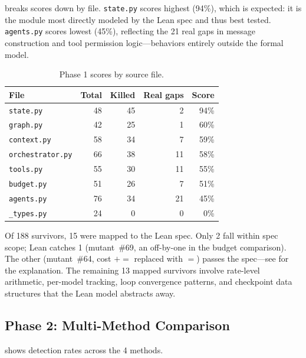 \documentclass[11pt,a4paper]{article}
\begin{document}
 breaks scores down by file. \texttt{state.py}
scores highest (94\%), which is expected: it is the module most
directly modeled by the Lean spec and thus best tested.
\texttt{agents.py} scores lowest (45\%), reflecting the 21 real
gaps in message construction and tool permission logic---behaviors
entirely outside the formal model.

\begin{table}[htbp]
\centering
\caption{Phase 1 scores by source file.}
\label{tab:byfile}
\small
\begin{tabular}{@{}lrrrr@{}}
\toprule
\textbf{File} & \textbf{Total} & \textbf{Killed} & \textbf{Real gaps} & \textbf{Score} \\
\midrule
\texttt{state.py} & 48 & 45 & 2 & 94\% \\
\texttt{graph.py} & 42 & 25 & 1 & 60\% \\
\texttt{context.py} & 58 & 34 & 7 & 59\% \\
\texttt{orchestrator.py} & 66 & 38 & 11 & 58\% \\
\texttt{tools.py} & 55 & 30 & 11 & 55\% \\
\texttt{budget.py} & 51 & 26 & 7 & 51\% \\
\texttt{agents.py} & 76 & 34 & 21 & 45\% \\
\texttt{\_types.py} & 24 & 0 & 0 & 0\% \\
\bottomrule
\end{tabular}
\end{table}

Of 188 survivors, 15 were mapped to the Lean spec. Only 2 fall within
spec scope; Lean catches 1 (mutant~\#69, an off-by-one in the budget
comparison). The other (mutant~\#64, cost $+=$ replaced with $=$) passes
the spec---see  for the explanation. The remaining
13 mapped survivors involve rate-level arithmetic, per-model tracking,
loop convergence patterns, and checkpoint data structures that the
Lean model abstracts away.

\subsection{Phase 2: Multi-Method Comparison}

 shows detection rates across the 4 methods.
\end{document}
